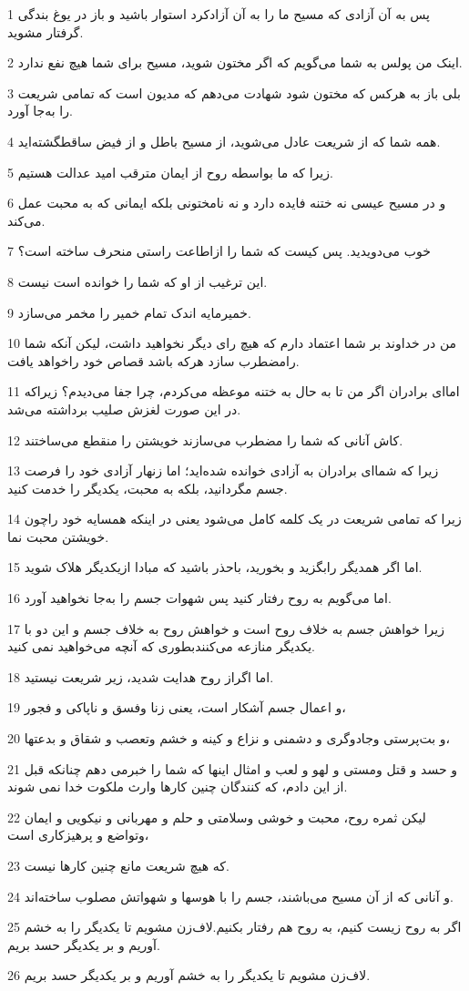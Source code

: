 \par 1 پس به آن آزادی که مسیح ما را به آن آزادکرد استوار باشید و باز در یوغ بندگی گرفتار مشوید.
\par 2 اینک من پولس به شما می‌گویم که اگر مختون شوید، مسیح برای شما هیچ نفع ندارد.
\par 3 بلی باز به هرکس که مختون شود شهادت می‌دهم که مدیون است که تمامی شریعت را به‌جا آورد.
\par 4 همه شما که از شریعت عادل می‌شوید، از مسیح باطل و از فیض ساقطگشته‌اید.
\par 5 زیرا که ما بواسطه روح از ایمان مترقب امید عدالت هستیم.
\par 6 و در مسیح عیسی نه ختنه فایده دارد و نه نامختونی بلکه ایمانی که به محبت عمل می‌کند.
\par 7 خوب می‌دویدید. پس کیست که شما را ازاطاعت راستی منحرف ساخته است؟
\par 8 این ترغیب از او که شما را خوانده است نیست.
\par 9 خمیرمایه اندک تمام خمیر را مخمر می‌سازد.
\par 10 من در خداوند بر شما اعتماد دارم که هیچ رای دیگر نخواهید داشت، لیکن آنکه شما رامضطرب سازد هرکه باشد قصاص خود راخواهد یافت.
\par 11 اما‌ای برادران اگر من تا به حال به ختنه موعظه می‌کردم، چرا جفا می‌دیدم؟ زیراکه در این صورت لغزش صلیب برداشته می‌شد.
\par 12 کاش آنانی که شما را مضطرب می‌سازند خویشتن را منقطع می‌ساختند.
\par 13 زیرا که شما‌ای برادران به آزادی خوانده شده‌اید؛ اما زنهار آزادی خود را فرصت جسم مگردانید، بلکه به محبت، یکدیگر را خدمت کنید.
\par 14 زیرا که تمامی شریعت در یک کلمه کامل می‌شود یعنی در اینکه همسایه خود راچون خویشتن محبت نما.
\par 15 اما اگر همدیگر رابگزید و بخورید، باحذر باشید که مبادا ازیکدیگر هلاک شوید.
\par 16 اما می‌گویم به روح رفتار کنید پس شهوات جسم را به‌جا نخواهید آورد.
\par 17 زیرا خواهش جسم به خلاف روح است و خواهش روح به خلاف جسم و این دو با یکدیگر منازعه می‌کنندبطوری که آنچه می‌خواهید نمی کنید.
\par 18 اما اگراز روح هدایت شدید، زیر شریعت نیستید.
\par 19 و اعمال جسم آشکار است، یعنی زنا وفسق و ناپاکی و فجور،
\par 20 و بت‌پرستی وجادوگری و دشمنی و نزاع و کینه و خشم وتعصب و شقاق و بدعتها،
\par 21 و حسد و قتل ومستی و لهو و لعب و امثال اینها که شما را خبرمی دهم چنانکه قبل از این دادم، که کنندگان چنین کارها وارث ملکوت خدا نمی شوند.
\par 22 لیکن ثمره روح، محبت و خوشی وسلامتی و حلم و مهربانی و نیکویی و ایمان وتواضع و پرهیزکاری است،
\par 23 که هیچ شریعت مانع چنین کارها نیست.
\par 24 و آنانی که از آن مسیح می‌باشند، جسم را با هوسها و شهواتش مصلوب ساخته‌اند.
\par 25 اگر به روح زیست کنیم، به روح هم رفتار بکنیم.لاف‌زن مشویم تا یکدیگر را به خشم آوریم و بر یکدیگر حسد بریم.
\par 26 لاف‌زن مشویم تا یکدیگر را به خشم آوریم و بر یکدیگر حسد بریم.

